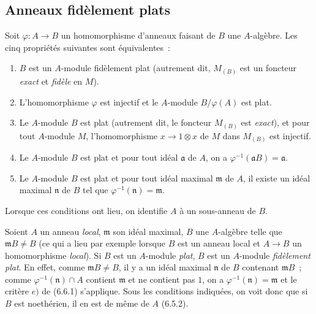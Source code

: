 \subsection{Anneaux fidèlement plats}
\label{subsection:0.6.6-fr}

\begin{env}[6.6.1]
\label{0.6.6.1-fr}
Soit $\varphi:A\to B$ un homomorphisme d'anneaux faisant de $B$ une
$A$-algèbre. Les cinq propriétés suivantes sont équivalentes~:
\begin{enumerate}
  \item[$a)$] $B$ est un $A$-module fidèlement plat (autrement dit,
    $M_{(B)}$ est un foncteur \emph{exact} et \emph{fidèle} en $M$).
  \item[$b)$] L'homomorphisme $\varphi$ est injectif et le $A$-module
    $B/\varphi(A)$ est plat.


  \item[$c)$] Le $A$-module $B$ est plat (autrement dit, le foncteur
    $M_{(B)}$ est \emph{exact}), et pour tout $A$-module $M$, l'homomorphisme
    $x\to1\otimes x$ de $M$ dans $M_{(B)}$ est injectif.
  \item[$d)$] Le $A$-module $B$ est plat et pour tout idéal $\mathfrak a$ de
    $A$, on a $\varphi^{-1}(\mathfrak aB)=\mathfrak a$.
  \item[$e)$] Le $A$-module $B$ est plat et pour tout idéal maximal
    $\mathfrak m$ de $A$, il existe un idéal maximal $\mathfrak n$ de $B$ tel
    que $\varphi^{-1}(\mathfrak n)=\mathfrak m$.
\end{enumerate}

Lorsque ces conditions ont lieu, on identifie $A$ à un sous-anneau de $B$.
\end{env}

\begin{env}[6.6.2]
\label{0.6.6.2-fr}
Soient $A$ un anneau \emph{local}, $\mathfrak m$ son idéal maximal, $B$ une
$A$-algèbre telle que $\mathfrak mB\neq B$ (ce qui a lieu par exemple lorsque
$B$ est un anneau local et $A\to B$ un homomorphisme \emph{local}). Si $B$ est un
$A$-module \emph{plat}, $B$ est un $A$-module \emph{fidèlement plat}. En effet, comme
$\mathfrak mB\neq B$, il y a un idéal maximal $\mathfrak n$ de $B$ contenant
$\mathfrak mB$~; comme $\varphi^{-1}(\mathfrak n)\cap A$ contient
$\mathfrak m$ et ne contient pas $1$, on a
$\varphi^{-1}(\mathfrak n)=\mathfrak m$ et le critère $e)$ de (6.6.1)
s'applique. Sous les conditions indiquées, on voit donc que si $B$ est
noethérien, il en est de même de $A$ (6.5.2).
\end{env}

